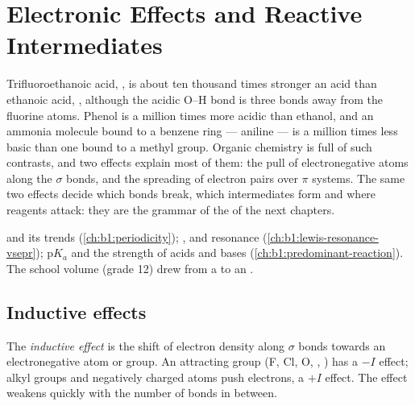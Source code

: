 \chapter{Electronic Effects and Reactive Intermediates}\label{ch:b1:electronic-effects}

Trifluoroethanoic acid, , is about ten thousand times
stronger an acid than ethanoic acid, , although the acidic
O--H bond is three bonds away from the fluorine atoms. Phenol is a
million times more acidic than ethanol, and an ammonia molecule bound to
a benzene ring --- aniline --- is a million times less basic than one
bound to a methyl group. Organic chemistry is full of such contrasts, and
two effects explain most of them: the pull of electronegative atoms along
the $\sigma$ bonds, and the spreading of electron pairs over $\pi$
systems. The same two effects decide which bonds break, which
intermediates form and where reagents attack: they are the grammar of the
 of the next chapters.

\begin{recall}
 and its trends (\cref{ch:b1:periodicity}); ,  and resonance (\cref{ch:b1:lewis-resonance-vsepr});
$\mathrm{p}K_a$ and the strength of acids and bases
(\cref{ch:b1:predominant-reaction}). The school volume (grade 12) drew
 from a  to an .
\end{recall}

\section{Inductive effects}

\begin{definition}\label{def:b1:electronic-effects:inductive}
The \emph{inductive effect} is the shift of
electron density along $\sigma$ bonds towards an electronegative atom or
group. An attracting group (F, Cl, O, , ) has a $-I$
effect; alkyl groups and negatively charged atoms push electrons, a $+I$
effect. The effect weakens quickly with the number of bonds in between.
\end{definition}

